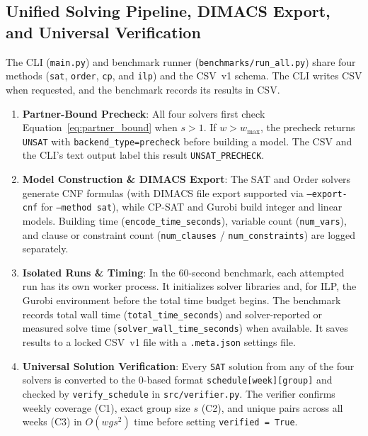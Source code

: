 \documentclass[a4paper,fleqn]{cas-sc}
\begin{document}
\subsection{Unified Solving Pipeline, DIMACS Export, and Universal Verification}
\label{sec:pipeline}

The CLI (\texttt{main.py}) and benchmark runner
(\texttt{benchmarks/run\_all.py}) share four methods (\texttt{sat},
\texttt{order}, \texttt{cp}, and \texttt{ilp}) and the CSV~v1 schema.
The CLI writes CSV when requested, and the benchmark records its results in CSV.
\begin{enumerate}[label=(\arabic*),noitemsep]
    \item \textbf{Partner-Bound Precheck}: All four solvers first check Equation~\eqref{eq:partner_bound} when $s > 1$. If $w > w_{\max}$, the precheck returns \texttt{UNSAT} with
    \texttt{backend\_type=precheck} before building a model. The CSV and the
    CLI's text output label this result \texttt{UNSAT\_PRECHECK}.
    \item \textbf{Model Construction \& DIMACS Export}: The SAT and Order solvers generate CNF formulas (with DIMACS file export supported via \texttt{--export-cnf} for \texttt{--method sat}), while CP-SAT and Gurobi build integer and linear models. Building time (\texttt{encode\_time\_seconds}), variable count (\texttt{num\_vars}), and clause or constraint count (\texttt{num\_clauses} / \texttt{num\_constraints}) are logged separately.
    \item \textbf{Isolated Runs \& Timing}: In the 60-second benchmark, each attempted run has its own worker
    process. It initializes solver libraries and, for ILP, the Gurobi
    environment before the total time budget begins. The benchmark records
    total wall time (\texttt{total\_time\_seconds}) and solver-reported or
    measured solve time (\texttt{solver\_wall\_time\_seconds}) when available.
    It saves results to a locked CSV~v1 file with a \texttt{.meta.json}
    settings file.
    \item \textbf{Universal Solution Verification}: Every \texttt{SAT} solution from any of the four solvers is converted to the 0-based format \texttt{schedule[week]}\allowbreak\texttt{[group]} and checked by \texttt{verify\_schedule} in \texttt{src/verifier.py}. The verifier confirms weekly coverage (C1), exact group size $s$ (C2), and unique pairs across all weeks (C3) in $O(w g s^2)$ time before setting \texttt{verified = True}.
\end{enumerate}
\end{document}
